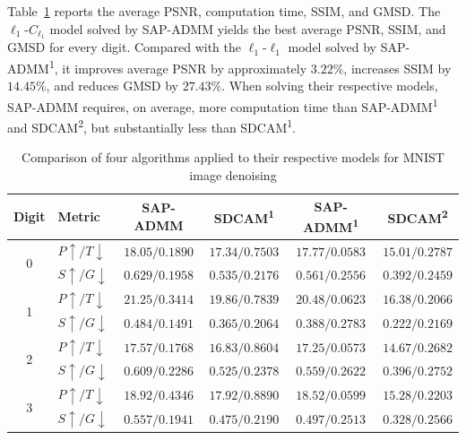 Table~\ref{tab:mnist_four_models_compact} reports the average
PSNR, computation time, SSIM, and GMSD.
The \(\ell_1\)-\(C_{\ell_1}\) model solved by SAP-ADMM
yields the best average PSNR, SSIM, and GMSD for every digit.
Compared with the \(\ell_1\)-\(\ell_1\) model solved by
SAP-ADMM\textsuperscript{1}, it improves average PSNR by
approximately \(3.22\%\), increases SSIM by \(14.45\%\), and
reduces GMSD by \(27.43\%\).
When solving their respective models, SAP-ADMM requires,
on average, more computation time than SAP-ADMM\textsuperscript{1} and
SDCAM\textsuperscript{2}, but substantially less than
SDCAM\textsuperscript{1}.

\begin{table}[htbp]
\centering
\caption{Comparison of four algorithms applied to their respective
models for MNIST image denoising}
\label{tab:mnist_four_models_compact}
\scriptsize
\setlength{\tabcolsep}{3.6pt}
\renewcommand{\arraystretch}{1.08}
\begin{tabular}{@{}c l c c c c@{}}
\toprule
Digit & Metric
& SAP-ADMM
& SDCAM\textsuperscript{1}
& SAP-ADMM\textsuperscript{1}
& SDCAM\textsuperscript{2} \\
\midrule
\multirow{2}{*}{0}
& \(P\uparrow/T\downarrow\) & \(\mathbf{18.05}/0.1890\) & \(17.34/0.7503\) & \(17.77/\mathbf{0.0583}\) & \(15.01/0.2787\) \\
& \(S\uparrow/G\downarrow\) & \(\mathbf{0.629}/\mathbf{0.1958}\) & \(0.535/0.2176\) & \(0.561/0.2556\) & \(0.392/0.2459\) \\
\midrule
\multirow{2}{*}{1}
& \(P\uparrow/T\downarrow\) & \(\mathbf{21.25}/0.3414\) & \(19.86/0.7839\) & \(20.48/\mathbf{0.0623}\) & \(16.38/0.2066\) \\
& \(S\uparrow/G\downarrow\) & \(\mathbf{0.484}/\mathbf{0.1491}\) & \(0.365/0.2064\) & \(0.388/0.2783\) & \(0.222/0.2169\) \\
\midrule
\multirow{2}{*}{2}
& \(P\uparrow/T\downarrow\) & \(\mathbf{17.57}/0.1768\) & \(16.83/0.8604\) & \(17.25/\mathbf{0.0573}\) & \(14.67/0.2682\) \\
& \(S\uparrow/G\downarrow\) & \(\mathbf{0.609}/\mathbf{0.2286}\) & \(0.525/0.2378\) & \(0.559/0.2622\) & \(0.396/0.2752\) \\
\midrule
\multirow{2}{*}{3}
& \(P\uparrow/T\downarrow\) & \(\mathbf{18.92}/0.4346\) & \(17.92/0.8890\) & \(18.52/\mathbf{0.0599}\) & \(15.28/0.2203\) \\
& \(S\uparrow/G\downarrow\) & \(\mathbf{0.557}/\mathbf{0.1941}\) & \(0.475/0.2190\) & \(0.497/0.2513\) & \(0.328/0.2566\) \\

\end{tabular}
\end{table}
